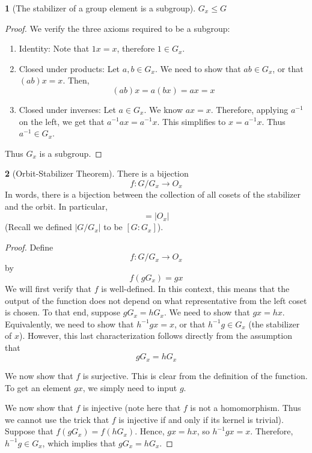 \documentclass[12pt]{article}
\theoremstyle{definition}
\newtheorem{theorem}{\color{ForestGreen}{\textbf{Theorem}}}
\theoremstyle{definition}
\begin{document}
\begin{theorem}[The stabilizer of a group element is a subgroup]
$G_x \leq G$
\end{theorem}
\begin{proof}
We verify the three axioms required to be a subgroup:
\begin{enumerate}
	\item Identity: Note that $1 x = x$, therefore $1 \in G_x$. 
	\item Closed under products: Let $a,b \in G_x$. We need to show that $ab \in G_x$, or that $(ab)x = x$. Then,
	\begin{equation}
		(ab)x = a(bx)= ax = x
	\end{equation}
	\item Closed under inverses: Let $a \in G_x$. We know $ax = x$. Therefore, applying $a^{-1}$ on the left, we get that
	$a^{-1} a x = a^{-1} x$. This simplifies to $x = a^{-1} x$. Thus $a^{-1} \in G_x$. 
\end{enumerate}
Thus $G_x$ is a subgroup. 
\end{proof}

\begin{theorem}[Orbit-Stabilizer Theorem]
There is a bijection 
\begin{equation}
	f : G / G_x \to O_x
\end{equation}
In words, there is a bijection between the collection of all cosets of the stabilizer and the orbit. In particular, 
\begin{equation}
	[G:G_x] = |O_x|
\end{equation}
(Recall we defined $|G / G_x|$ to be $[G:G_x]$). 
\end{theorem}
\begin{proof}
Define 
\begin{equation}
	f : G / G_x \to O_x 
\end{equation}
by
\begin{equation}
	f(gG_x) = gx
\end{equation}
We will first verify that $f$ is well-defined. In this context, this means that the output of the function does not depend on what representative from the left coset is chosen. To that end, suppose $gG_x = hG_x$. We need to show that $gx = hx$. Equivalently, we need to show that $h^{-1}gx=x$, or that $h^{-1}g \in G_x$ (the stabilizer of $x$). However, this last characterization follows directly from the assumption that 
\begin{equation}
	gG_x = hG_x
\end{equation}

We now show that $f$ is surjective. This is clear from the definition of the function. To get an element $gx$, we simply need to input $g$.

We now show that $f$ is injective (note here that $f$ is not a homomorphism. Thus we cannot use the trick that $f$ is injective if and only if its kernel is trivial). Suppose that $f(gG_x) = f(hG_x)$. Hence, $gx = hx$, so $h^{-1}gx = x$. Therefore, $h^{-1}g \in G_x$, which implies that $gG_x = hG_x$. 
\end{proof}
\end{document}
